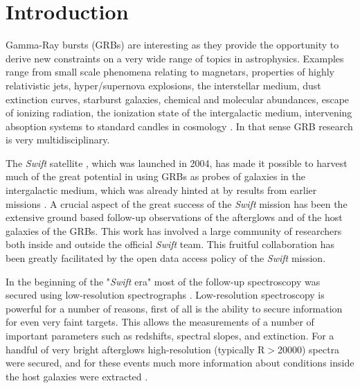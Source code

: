 \documentclass{aa}    %
\begin{document}
\section{Introduction}

Gamma-Ray bursts (GRBs) are interesting as they provide the opportunity to
derive new constraints on a very wide range of topics in astrophysics. Examples
range from small scale phenomena relating to magnetars, properties of highly
relativistic jets, hyper/supernova explosions, the interstellar medium, dust
extinction curves, starburst galaxies, chemical and molecular abundances, escape
of ionizing radiation, the ionization state of the intergalactic medium,
intervening absoption systems to standard candles in cosmology
\citep[e.g.,][]{Lyons2010, Molinari2007, HjorthBloom2012, Wijers1998,
	Prochaska2009, Savaglio2006, Ghirlanda2007}. In that sense GRB research is very
multidisciplinary.

The {\it Swift} satellite \citep{Gehrels2009}, which was launched in 2004, has
made it possible to harvest much of the great potential in using GRBs as probes
of galaxies in the intergalactic medium, which was already hinted at by results
from earlier missions \citep[e.g.,][]{Ricker2004}. A crucial aspect of the great
success of the {\it Swift} mission has been the extensive ground based
follow-up observations of the afterglows and of the host galaxies of the GRBs.
This work has involved a large community of researchers both inside and outside
the official {\it Swift} team. This fruitful collaboration has been greatly
facilitated by the open data access policy of the {\it Swift} mission.

In the beginning of the "{\it Swift} era" most of the follow-up spectroscopy was
secured using low-resolution spectrographs \citep[typically
R=$\lambda/\Delta\lambda$$<$1000, e.g.][]{Fynbo2009}. Low-resolution
spectroscopy is powerful for a number of reasons, first of all is the ability to
secure information for even very faint targets. This allows the measurements of
a number of important parameters such as redshifts, spectral slopes, and
extinction. For a handful of very bright afterglows high-resolution (typically
R$>$20000) spectra were secured, and for these events much more information
about conditions inside the host galaxies were extracted
\citep[e.g.,][]{Fiore2005, Thone2007, Prochaska2007, Vreeswijk2007,
	Castro-Tirado2010}.
\end{document}
